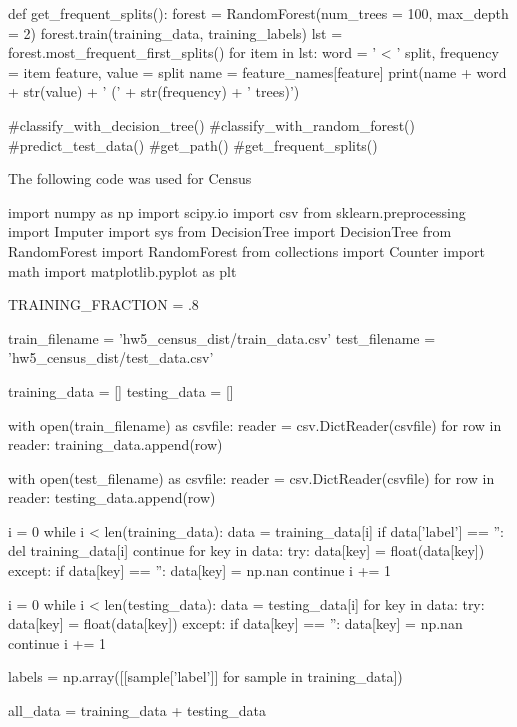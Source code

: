 \documentclass{article}
\begin{document}
\begin{python}
def get_frequent_splits():
    forest = RandomForest(num_trees = 100, max_depth = 2)
    forest.train(training_data, training_labels)
    lst = forest.most_frequent_first_splits()
    for item in lst:
        word = ' < '
        split, frequency = item
        feature, value = split
        name = feature_names[feature]
        print(name + word + str(value) + ' (' + str(frequency) + ' trees)')

#classify_with_decision_tree()
#classify_with_random_forest()
#predict_test_data()
#get_path()
#get_frequent_splits()

\end{python}

\newpage

The following code was used for Census

\begin{python}
import numpy as np
import scipy.io
import csv
from sklearn.preprocessing import Imputer
import sys
from DecisionTree import DecisionTree
from RandomForest import RandomForest
from collections import Counter
import math
import matplotlib.pyplot as plt

TRAINING_FRACTION = .8

train_filename = 'hw5_census_dist/train_data.csv'
test_filename = 'hw5_census_dist/test_data.csv'

training_data = []
testing_data = []

with open(train_filename) as csvfile:
    reader = csv.DictReader(csvfile)
    for row in reader:
        training_data.append(row)

with open(test_filename) as csvfile:
    reader = csv.DictReader(csvfile)
    for row in reader:
        testing_data.append(row)

i = 0
while i < len(training_data):
    data = training_data[i]
    if data['label'] == '':
        del training_data[i]
        continue
    for key in data:
        try:
            data[key] = float(data[key])
        except:
            if data[key] == '':
                data[key] = np.nan
            continue
    i += 1

i = 0
while i < len(testing_data):
    data = testing_data[i]
    for key in data:
        try:
            data[key] = float(data[key])
        except:
            if data[key] == '':
                data[key] = np.nan
            continue
    i += 1

labels = np.array([[sample['label']] for sample in training_data])

all_data = training_data + testing_data


\end{python}
\end{document}

